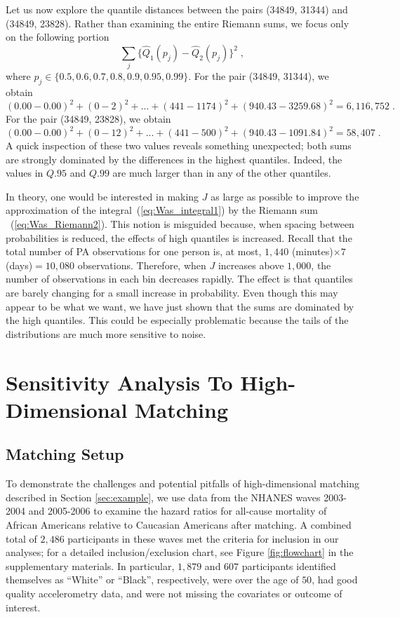 Let us now explore the quantile distances between the pairs (34849, 31344) and (34849, 23828). Rather than examining the entire Riemann sums, we focus only on the following portion
$$\sum_{j}\{\widehat{Q}_1(p_j)-\widehat{Q}_2(p_j)\}^2\;,$$
where $p_j\in\{0.5,0.6,0.7,0.8,0.9,0.95,0.99\}$. For the pair (34849, 31344), we obtain
\[(0.00-0.00)^2+(0-2)^2+...+(441-1174)^2+(940.43-3259.68)^2=6{,}116{,}752\;.\]
For the pair (34849, 23828), we obtain
\[(0.00-0.00)^2+(0-12)^2+...+(441-500)^2+(940.43-1091.84)^2=58{,}407\;.\]
A quick inspection of these two values reveals something unexpected; both sums are strongly dominated by the differences in the highest quantiles. Indeed, the values in $Q.95$ and $Q.99$ are much larger than in any of the other quantiles. 

In theory, one would be interested in making $J$ as large as possible to improve the approximation of the integral~(\ref{eq:Was_integral1}) by the Riemann sum ~(\ref{eq:Was_Riemann2}). This notion is misguided because, when spacing between probabilities is reduced, the effects of high quantiles is increased. Recall that the total number of PA observations for one person is, at most, $1{,}440$ (minutes)$\times 7$ (days)$  =10{,}080$ observations. Therefore, when $J$ increases above $1{,}000$, the number of observations in each bin decreases rapidly. The effect is that quantiles are barely changing for a small increase in probability. Even though this may appear to be what we want, we have just shown that the sums are dominated by the high quantiles. This could be especially problematic because the tails of the distributions are much more sensitive to noise. 

\section{Sensitivity Analysis To High-Dimensional Matching}\label{sec:sensitivity}

\subsection{Matching Setup}
To demonstrate the challenges and potential pitfalls of high-dimensional matching described in Section \ref{sec:example}, 
we use data from the NHANES waves 2003-2004 and 2005-2006 to examine the hazard ratios for all-cause mortality of African Americans relative to Caucasian Americans after matching. A combined total of $2{,}486$ participants in these waves met the criteria for inclusion in our analyses; for a detailed inclusion/exclusion chart, see Figure \ref{fig:flowchart} in the supplementary materials. In particular, $1{,}879$ and $607$ participants identified themselves as ``White'' or ``Black'', respectively, were over the age of $50$, had good quality accelerometry data, and were not missing the covariates or outcome of interest.

